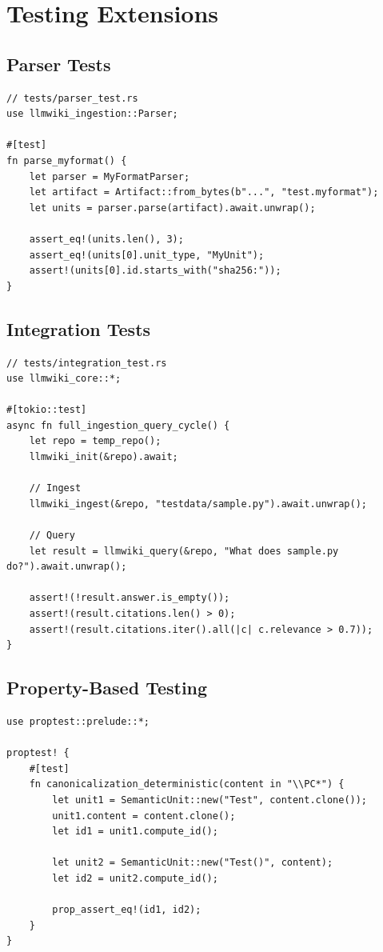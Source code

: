 \section{Testing Extensions}
\label{sec:dev:testing}

\subsection{Parser Tests}
\begin{verbatim}
// tests/parser_test.rs
use llmwiki_ingestion::Parser;

#[test]
fn parse_myformat() {
    let parser = MyFormatParser;
    let artifact = Artifact::from_bytes(b"...", "test.myformat");
    let units = parser.parse(artifact).await.unwrap();
    
    assert_eq!(units.len(), 3);
    assert_eq!(units[0].unit_type, "MyUnit");
    assert!(units[0].id.starts_with("sha256:"));
}
\end{verbatim}

\subsection{Integration Tests}
\begin{verbatim}
// tests/integration_test.rs
use llmwiki_core::*;

#[tokio::test]
async fn full_ingestion_query_cycle() {
    let repo = temp_repo();
    llmwiki_init(&repo).await;
    
    // Ingest
    llmwiki_ingest(&repo, "testdata/sample.py").await.unwrap();
    
    // Query
    let result = llmwiki_query(&repo, "What does sample.py do?").await.unwrap();
    
    assert!(!result.answer.is_empty());
    assert!(result.citations.len() > 0);
    assert!(result.citations.iter().all(|c| c.relevance > 0.7));
}
\end{verbatim}

\subsection{Property-Based Testing}
\begin{verbatim}
use proptest::prelude::*;

proptest! {
    #[test]
    fn canonicalization_deterministic(content in "\\PC*") {
        let unit1 = SemanticUnit::new("Test", content.clone());
        unit1.content = content.clone();
        let id1 = unit1.compute_id();
        
        let unit2 = SemanticUnit::new("Test()", content);
        let id2 = unit2.compute_id();
        
        prop_assert_eq!(id1, id2);
    }
}
\end{verbatim}

